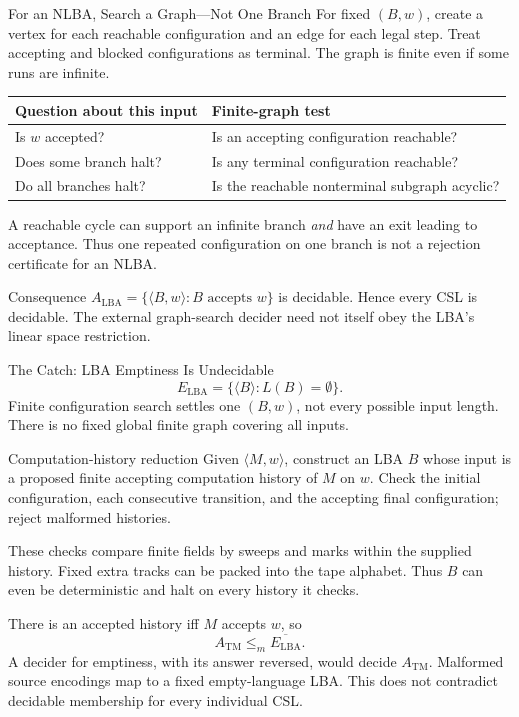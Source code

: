 \documentclass[10pt]{beamer}
\newcommand{\ATM}{A_{\mathrm{TM}}}
\begin{document}
\begin{frame}{For an NLBA, Search a Graph---Not One Branch}
  \small
  For fixed $(B,w)$, create a vertex for each reachable configuration and
  an edge for each legal step. Treat accepting and blocked configurations
  as terminal. The graph is finite even if some runs are infinite.
  \begin{center}
  \begin{tabular}{L{4.5cm}L{5.8cm}}
    \toprule
    Question about this input & Finite-graph test \\
    \midrule
    Is $w$ accepted? & Is an accepting configuration reachable? \\
    Does some branch halt? & Is any terminal configuration reachable? \\
    Do all branches halt? & Is the reachable nonterminal subgraph acyclic? \\
    \bottomrule
  \end{tabular}
  \end{center}
  A reachable cycle can support an infinite branch \emph{and} have an exit
  leading to acceptance. Thus one repeated configuration on one branch
  is not a rejection certificate for an NLBA.
  \begin{block}{Consequence}
    $A_{\mathrm{LBA}}=\{\langle B,w\rangle:B\text{ accepts }w\}$ is decidable.
    Hence every CSL is decidable. The external graph-search decider need
    not itself obey the LBA's linear space restriction.
  \end{block}
\end{frame}

\begin{frame}{The Catch: LBA Emptiness Is Undecidable}
  \small
  \[
    E_{\mathrm{LBA}}=\{\langle B\rangle:L(B)=\emptyset\}.
  \]
  Finite configuration search settles one $(B,w)$, not every possible
  input length. There is no fixed global finite graph covering all inputs.
  \begin{block}{Computation-history reduction \cite{sipser-history}}
    Given $\langle M,w\rangle$, construct an LBA $B$ whose input is a
    proposed finite accepting computation history of $M$ on $w$.
    Check the initial configuration, each consecutive transition, and
    the accepting final configuration; reject malformed histories.
    \par\smallskip
    These checks compare finite fields by sweeps and marks within the
    supplied history. Fixed extra tracks can be packed into the tape alphabet.
    Thus $B$ can even be deterministic and halt on every history it checks.
  \end{block}
  There is an accepted history iff $M$ accepts $w$, so
  \[
    \ATM\le_m\overline{E_{\mathrm{LBA}}}.
  \]
  A decider for emptiness, with its answer reversed, would decide $\ATM$.
  Malformed source encodings map to a fixed empty-language LBA.
  This does not contradict decidable membership for every individual CSL.
\end{frame}
\end{document}
